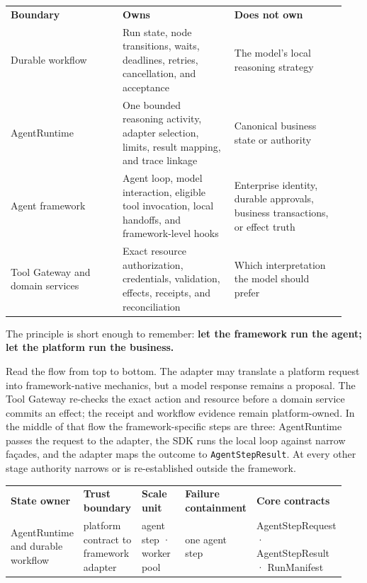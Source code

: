 \BookTableStart
\small
\begin{tabular}{@{}Y{0.3133\linewidth}Y{0.3133\linewidth}Y{0.3133\linewidth}@{}}
\color{white}\bfseries Boundary & \color{white}\bfseries Owns & \color{white}\bfseries Does not own \\
Durable workflow & Run state, node transitions, waits, deadlines, retries, cancellation, and acceptance & The model’s local reasoning strategy \\
AgentRuntime & One bounded reasoning activity, adapter selection, limits, result mapping, and trace linkage & Canonical business state or authority \\
Agent framework & Agent loop, model interaction, eligible tool invocation, local handoffs, and framework-level hooks & Enterprise identity, durable approvals, business transactions, or effect truth \\
Tool Gateway and domain services & Exact resource authorization, credentials, validation, effects, receipts, and reconciliation & Which interpretation the model should prefer \\
\end{tabular}
\BookTableEnd

The principle is short enough to remember: \textbf{let the framework run the agent; let the platform run the business.}\par


Read the flow from top to bottom. The adapter may translate a platform request into framework-native mechanics, but a model response remains a proposal. The Tool Gateway re-checks the exact action and resource before a domain service commits an effect; the receipt and workflow evidence remain platform-owned. In the middle of that flow the framework-specific steps are three: AgentRuntime passes the request to the adapter, the SDK runs the local loop against narrow façades, and the adapter maps the outcome to \lstinline[style=bookinline]!AgentStepResult!. At every other stage authority narrows or is re-established outside the framework.\par

\BookTableStart
\fontsize{7.2}{9}\selectfont
\begin{tabular}{@{}Y{0.1880\linewidth}Y{0.1880\linewidth}Y{0.1880\linewidth}Y{0.1880\linewidth}Y{0.1880\linewidth}@{}}
\color{white}\bfseries \textbf{State owner} & \color{white}\bfseries \textbf{Trust boundary} & \color{white}\bfseries \textbf{Scale unit} & \color{white}\bfseries \textbf{Failure containment} & \color{white}\bfseries \textbf{Core contracts} \\
AgentRuntime and durable workflow & platform contract to framework adapter & agent step · worker pool & one agent step & AgentStepRequest · AgentStepResult · RunManifest \\
\end{tabular}
\BookTableEnd

